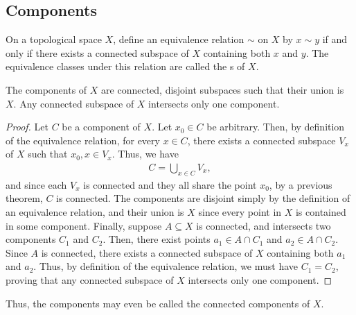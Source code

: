 \subsection{Components}
On a topological space $X$, define an equivalence relation $\sim$ on $X$ by $x \sim y$ if and only if there exists a connected subspace of $X$ containing both $x$ and $y$. The equivalence classes under this relation are called the s of $X$.

\begin{theorem}
    The components of $X$ are connected, disjoint subspaces such that their union is $X$. Any connected subspace of $X$ intersects only one component.
\end{theorem}
\begin{proof}
    Let $C$ be a component of $X$. Let $x_{0} \in C$ be arbitrary. Then, by definition of the equivalence relation, for every $x \in C$, there exists a connected subspace $V_{x}$ of $X$ such that $x_{0}, x \in V_{x}$. Thus, we have
    \begin{align}
        C = \bigcup_{x \in C} V_{x},
    \end{align}
    and since each $V_{x}$ is connected and they all share the point $x_{0}$, by a previous theorem, $C$ is connected. The components are disjoint simply by the definition of an equivalence relation, and their union is $X$ since every point in $X$ is contained in some component. Finally, suppose $A \subseteq X$ is connected, and intersects two components $C_{1}$ and $C_{2}$. Then, there exist points $a_{1} \in A \cap C_{1}$ and $a_{2} \in A \cap C_{2}$. Since $A$ is connected, there exists a connected subspace of $X$ containing both $a_{1}$ and $a_{2}$. Thus, by definition of the equivalence relation, we must have $C_{1} = C_{2}$, proving that any connected subspace of $X$ intersects only one component.
\end{proof}

Thus, the components may even be called the connected components of $X$. 

